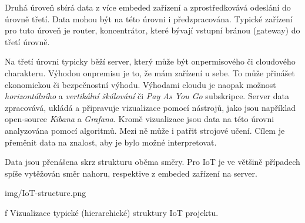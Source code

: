 {\sbf Druhá úroveň} sbírá data z více embeded zařízení a zprostředkovává odeslání do úrovně třetí. Data mohou být na této úrovni i předzpracována. Typické zařízení pro tuto úroveň je router, koncentrátor, které bývají vstupní bránou (gateway) do třetí úrovně.

Na {\sbf třetí úrovni} typicky běží server, který může být onpermisového či cloudového charakteru. Výhodou onpremisu je to, že mám zařízení u sebe. To může přinášet ekonomickou či bezpečnostní výhodu. Výhodami cloudu je naopak možnost {\em horizontálního} a {\em vertikální škálování} či {\em Pay As You Go} subskripce. Server data zpracovává, ukládá a připravuje vizualizace pomocí nástrojů, jako jsou například open-source {\em Kibana} a {\em Grafana}. Kromě vizualizace jsou data na této úrovni analyzována pomocí algoritmů. Mezi ně může i patřit strojové učení. Cílem je přeměnit data na znalost, aby je bylo možné interpretovat.

Data jsou přenášena skrz strukturu oběma směry. Pro IoT je ve většině případech spíše vytěžován směr nahoru, respektive z embeded zařízení na server.


\medskip
{}
\picw=15cm \cinspic img/IoT-structure.png
\caption/f Vizualizace typické (hierarchické) struktury IoT projektu.
\medskip